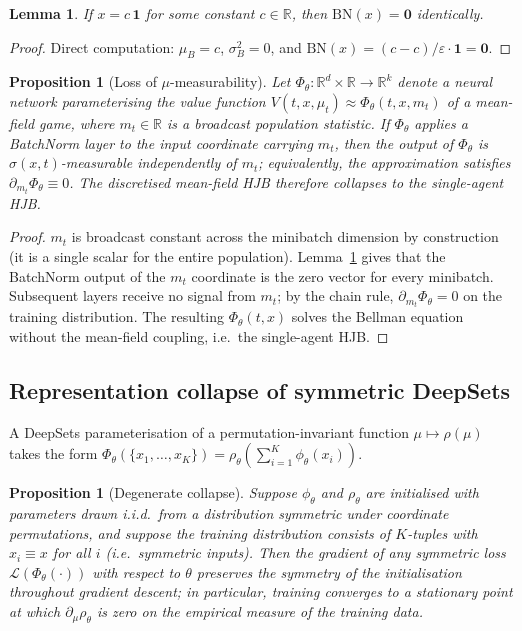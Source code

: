 \documentclass[11pt,a4paper]{article}
\newtheorem{proposition}[theorem]{Proposition}
\newtheorem{lemma}[theorem]{Lemma}
\theoremstyle{definition}
\theoremstyle{remark}
\newcommand{\R}{\mathbb{R}}
\begin{document}
\begin{lemma}\label{lem:bn-erasure}
If $x = c \, \mathbf{1}$ for some constant $c \in \R$, then
$\mathrm{BN}(x) = \mathbf{0}$ identically.
\end{lemma}

\begin{proof}
Direct computation: $\mu_B = c$, $\sigma_B^2 = 0$, and
$\mathrm{BN}(x) = (c - c)/\varepsilon \cdot \mathbf{1} = \mathbf{0}$.
\end{proof}

\begin{proposition}[Loss of $\mu$-measurability]\label{prop:mu-erasure}
Let $\Phi_\theta: \R^d \times \R \to \R^k$ denote a neural network
parameterising the value function $V(t, x, \mu_t) \approx \Phi_\theta(t, x, m_t)$
of a mean-field game, where $m_t \in \R$ is a broadcast population
statistic.  If $\Phi_\theta$ applies a BatchNorm layer to the
input coordinate carrying $m_t$, then the output of $\Phi_\theta$
is $\sigma(x, t)$-measurable independently of $m_t$; equivalently,
the approximation satisfies $\partial_{m_t} \Phi_\theta \equiv 0$.
The discretised mean-field HJB therefore collapses to the
single-agent HJB.
\end{proposition}

\begin{proof}
$m_t$ is broadcast constant across the minibatch dimension by
construction (it is a single scalar for the entire population).
Lemma~\ref{lem:bn-erasure} gives that the BatchNorm output of the
$m_t$ coordinate is the zero vector for every minibatch.
Subsequent layers receive no signal from $m_t$; by the chain
rule, $\partial_{m_t} \Phi_\theta = 0$ on the training
distribution.  The resulting $\Phi_\theta(t, x)$ solves the
Bellman equation without the mean-field coupling, i.e.\ the
single-agent HJB.
\end{proof}

\subsection{Representation collapse of symmetric DeepSets}

A DeepSets parameterisation \citep{zaheer2017} of a
permutation-invariant function $\mu \mapsto \rho(\mu)$ takes the
form
$\Phi_\theta(\{x_1, \ldots, x_K\}) = \rho_\theta\!\left( \sum_{i=1}^K \phi_\theta(x_i) \right)$.

\begin{proposition}[Degenerate collapse]\label{prop:deepsets-collapse}
Suppose $\phi_\theta$ and $\rho_\theta$ are initialised
with parameters drawn i.i.d.\ from a distribution symmetric under
coordinate permutations, and suppose the training distribution
consists of $K$-tuples with $x_i \equiv x$ for all $i$ (i.e.\
symmetric inputs).  Then the gradient of any symmetric loss
$\mathcal{L}(\Phi_\theta(\cdot))$ with respect to $\theta$
preserves the symmetry of the initialisation throughout
gradient descent; in particular, training converges to a
stationary point at which $\partial_{\mu} \rho_\theta$ is zero
on the empirical measure of the training data.
\end{proposition}
\end{document}
